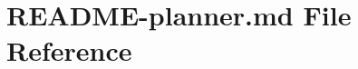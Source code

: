 \hypertarget{README-planner_8md}{}\section{R\+E\+A\+D\+M\+E-\/planner.md File Reference}
\label{README-planner_8md}
